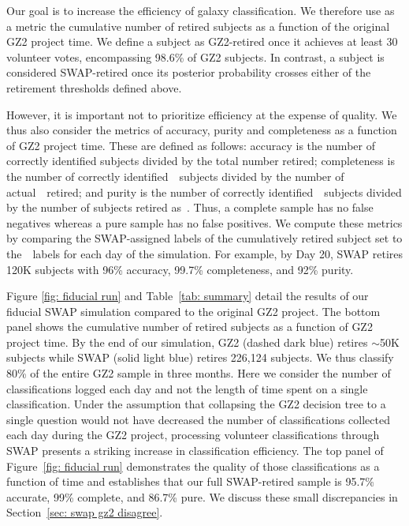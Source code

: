 Our goal is to increase the efficiency of galaxy classification. We therefore
 use as a metric the cumulative number of retired subjects
as a function of the original GZ2 project time.
We define a subject as GZ2-retired once it achieves at least 30 volunteer votes, 
encompassing 98.6\% of GZ2 subjects.
In contrast, a subject is considered SWAP-retired once its posterior 
probability crosses either of the retirement thresholds defined above. 


However, it is important not to prioritize efficiency at the expense of quality. 
We thus also consider the metrics of accuracy, 
purity and completeness as a function of GZ2 project time.  
These are defined as follows: accuracy is the number of correctly
identified subjects divided by the total number retired; completeness is the number of 
correctly identified~\feat~subjects divided by the number of actual~\feat~retired; 
and purity is the number of correctly identified~\feat~subjects divided by 
the number of subjects retired as~\feat. Thus, a complete sample has no false
negatives whereas a pure sample has no false positives. 
We compute these metrics by comparing the SWAP-assigned labels of the cumulatively 
retired subject set to the~\raw~labels for each day of the simulation. 
For example, by Day 20, SWAP retires 120K subjects with 96\% accuracy,
 99.7\% completeness, and 92\% purity. 

Figure \ref{fig: fiducial run} and Table~\ref{tab: summary} detail the results of 
our fiducial SWAP simulation compared to the original GZ2 project. 
The bottom panel shows the cumulative number of retired subjects as a function of 
GZ2 project time. By the end of our simulation, GZ2 (dashed dark blue)
 retires $\sim$50K subjects while SWAP (solid light blue) retires 226,124 subjects.  
We thus classify 80\% of the entire GZ2 sample in three months. 
Here we consider the number of classifications logged each day and not the length 
of time spent on a single classification.  Under the assumption that collapsing the 
GZ2 decision tree to a single question would not have decreased the number of 
classifications  collected each day during the GZ2 project, processing volunteer classifications 
through SWAP presents a striking increase in classification efficiency.
The top panel of Figure~\ref{fig: fiducial run} demonstrates the quality of 
those classifications as a function of time and establishes that our full 
SWAP-retired sample is 95.7\% accurate, 99\% complete, and 86.7\% pure. 
We discuss these small discrepancies in Section~\ref{sec: swap gz2 disagree}.

